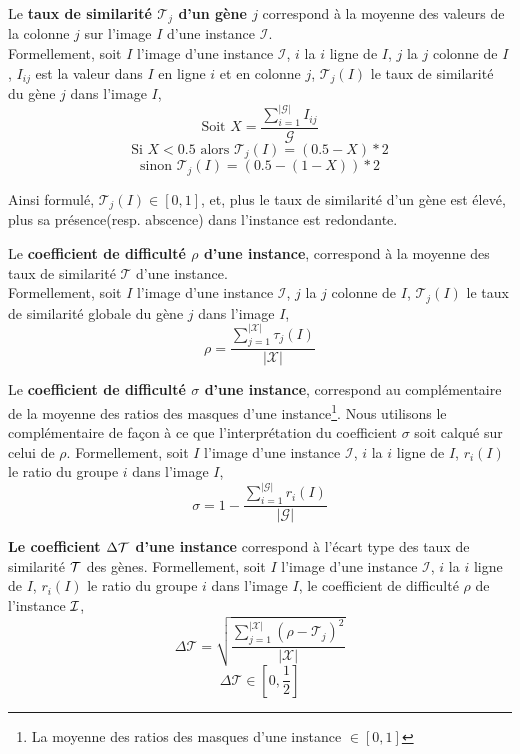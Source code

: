 \begin{definition}
Le \textbf{taux de similarité $\mathcal{T}_j$ d'un gène $j$} correspond à la moyenne des valeurs de la colonne $j$ sur l'image $I$ d'une instance $\mathcal{I}$.\\
Formellement, soit $I$ l'image d'une instance $\mathcal{I}$, $i$ la $i$ ligne de $I$, $j$ la $j$ colonne de $I$, $I_{ij}$ est la valeur dans $I$ en ligne $i$ et en colonne $j$, $\mathcal{T}_j(I)$ le taux de similarité du gène $j$ dans l'image $I$,
$$ \text{Soit } X=\frac{\sum_{i=1}^{|\mathcal{G}|} I_{ij}}{\mathcal{G}} $$ 
$$\text{Si } X<0.5 \text{ alors } \mathcal{T}_j(I)=(0.5-X)*2 $$
$$\text{sinon }\mathcal{T}_j(I)=(0.5-(1-X))*2$$ 
\end{definition}
Ainsi formulé, $\mathcal{T}_j(I) \in [0,1]$, et, plus le taux de similarité d'un gène est élevé, plus sa présence(resp. abscence) dans l'instance est redondante.

\begin{definition}
Le \textbf{coefficient de difficulté $\rho$ d'une instance}, correspond à la moyenne des taux de similarité $\mathcal{T}$ d'une instance.\\
Formellement, soit $I$ l'image d'une instance $\mathcal{I}$, $j$ la $j$ colonne de $I$, $\mathcal{T}_j(I)$ le taux de similarité globale du gène $j$ dans l'image $I$,
$$ \rho=\frac{\sum_{j=1}^{|\mathcal{X}|}\tau_j(I)}{|\mathcal{X}|} $$
\end{definition}

\begin{definition}
Le \textbf{coefficient de difficulté $\sigma$ d'une instance}, correspond au complémentaire de la moyenne des ratios des masques d'une instance\footnote{La moyenne des ratios des masques d'une instance $\in [0,1]$ }. Nous utilisons le complémentaire de façon à ce que l'interprétation du coefficient $\sigma$ soit calqué sur celui de $\rho$.
Formellement, soit $I$ l'image d'une instance $\mathcal{I}$, $i$ la $i$ ligne de $I$, $r_i(I)$ le ratio du groupe $i$ dans l'image $I$,
$$ \sigma=1-\frac{\sum_{i=1}^{|\mathcal{G}|}r_i(I)} {|\mathcal{G}|} $$
\end{definition}

\begin{definition}
\textbf{Le coefficient $\Delta\cal{T}$ d'une instance} correspond à l'écart type des taux de similarité $\cal{T}$ des gènes.
Formellement, soit $I$ l'image d'une instance $\mathcal{I}$, $i$ la $i$ ligne de $I$, $r_i(I)$ le ratio du groupe $i$ dans l'image $I$, le coefficient de difficulté $\rho$ de l'instance $\cal{I}$, 
$$\Delta\mathcal{T}=\sqrt{\frac{\sum_{j=1}^{|\mathcal{X}|} (\rho-\mathcal{T}_j)^2}{|\mathcal{X}|}}$$
$$\Delta\mathcal{T} \in [0,\frac{1}{2}]$$
\end{definition}

